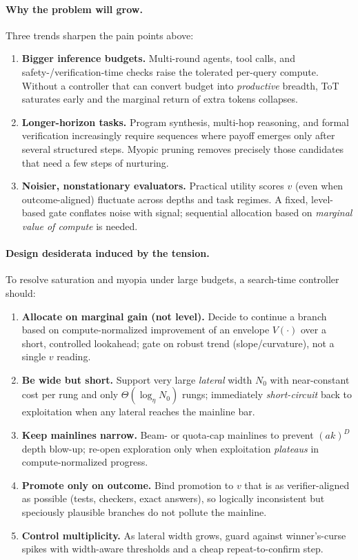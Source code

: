\documentclass{article}
\begin{document}
\paragraph{Why the problem will grow.}
Three trends sharpen the pain points above:
\begin{enumerate}[leftmargin=*, itemsep=2pt, topsep=2pt]
    \item \textbf{Bigger inference budgets.} Multi-round agents, tool calls, and safety-/verification-time checks raise the tolerated per-query compute. Without a controller that can convert budget into \emph{productive} breadth, ToT saturates early and the marginal return of extra tokens collapses.
    \item \textbf{Longer-horizon tasks.} Program synthesis, multi-hop reasoning, and formal verification increasingly require sequences where payoff emerges only after several structured steps. Myopic pruning removes precisely those candidates that need a few steps of nurturing.
    \item \textbf{Noisier, nonstationary evaluators.} Practical utility scores $v$ (even when outcome-aligned) fluctuate across depths and task regimes. A fixed, level-based gate conflates noise with signal; sequential allocation based on \emph{marginal value of compute} is needed.
\end{enumerate}

\paragraph{Design desiderata induced by the tension.}
To resolve saturation and myopia under large budgets, a search-time controller should:
\begin{enumerate}[leftmargin=*, itemsep=2pt, topsep=2pt]
    \item \textbf{Allocate on marginal gain (not level).} Decide to continue a branch based on compute-normalized improvement of an envelope $V(\cdot)$ over a short, controlled lookahead; gate on robust trend (slope/curvature), not a single $v$ reading.
    \item \textbf{Be wide but short.} Support very large \emph{lateral} width $N_0$ with near-constant cost per rung and only $\Theta(\log_{\eta} N_0)$ rungs; immediately \emph{short-circuit} back to exploitation when any lateral reaches the mainline bar.
    \item \textbf{Keep mainlines narrow.} Beam- or quota-cap mainlines to prevent $(ak)^D$ depth blow-up; re-open exploration only when exploitation \emph{plateaus} in compute-normalized progress.
    \item \textbf{Promote only on outcome.} Bind promotion to $v$ that is as verifier-aligned as possible (tests, checkers, exact answers), so logically inconsistent but speciously plausible branches do not pollute the mainline.
    \item \textbf{Control multiplicity.} As lateral width grows, guard against winner's-curse spikes with width-aware thresholds and a cheap repeat-to-confirm step.
\end{enumerate}
\end{document}
